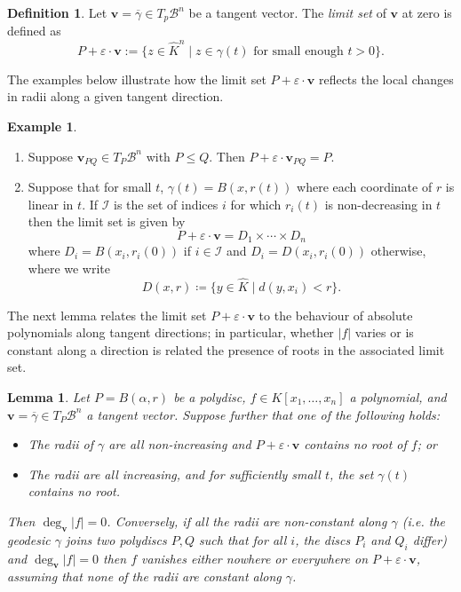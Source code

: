\documentclass[10pt]{article}
\newtheorem{lemma}[theorem]{Lemma}
\theoremstyle{definition}
\newtheorem{definition}[theorem]{Definition}
\newtheorem{example}[theorem]{Example}
\renewcommand{\vec}[1]{\mathbf{#1}}
\begin{document}
\begin{definition}
    Let $\vec{v} = \overline\gamma \in T_p \mathcal{B}^n$ be a tangent vector. The \emph{limit set} of $\vec{v}$ at zero is defined as
    $$
    P + \varepsilon \cdot \mathbf{v} := \{z \in \hat{K}^n \mid z \in \gamma(t) \text{ for small enough } t > 0 \}.
    $$
\end{definition}

The examples below illustrate how the limit set $P + \varepsilon \cdot \mathbf{v}$ reflects the local changes in radii along a given tangent direction.

\begin{example}
    \begin{enumerate}
        \item Suppose $\vec{v}_{PQ}\in T_P\mathcal B^n$ with $P \le Q$. Then $P + \varepsilon \cdot \mathbf{v}_{PQ} = P.$
        \item Suppose that for small $t$, $\gamma(t) = B(x, r(t))$ where each coordinate of $r$ is linear in $t$. If $\mathcal{I}$ is the set of indices $i$ for which $r_i(t)$ is non-decreasing in $t$ then the limit set is given by
        $$
        P + \varepsilon \cdot \mathbf{v} = D_1 \times \dotsb \times D_n
        $$
        where $D_i = B(x_i, r_i(0))$ if $i \in \mathcal{I}$ and $D_i = D(x_i, r_i(0))$ otherwise, where we write
        $$
        D(x, r) \coloneqq \{y \in \hat{K} \mid d(y, x_i) < r \}.
        $$
    \end{enumerate}
\end{example}

The next lemma relates the limit set $P + \varepsilon \cdot \vec v$ to the behaviour of absolute polynomials along tangent directions; in particular, whether $|f|$ varies or is constant along a direction is related the presence of roots in the associated limit set.

\begin{lemma} \label{lem:degreeCriterion}
    Let $P = B(\alpha, r)$ be a polydisc, $f \in K[x_1, \dotsc, x_n]$ a polynomial, and $\vec{v} = \overline \gamma \in T_P \mathcal{B}^n$ a tangent vector. Suppose further that one of the following holds:
    \begin{itemize}
        \item The radii of $\gamma$ are all non-increasing and $P + \varepsilon \cdot \mathbf{v}$ contains no root of $f$; or
        \item The radii are all increasing, and for sufficiently small $t$, the set $\gamma(t)$ contains no root.
    \end{itemize} 
    Then $\deg_{\vec{v}} \lvert f \rvert = 0$. 
    Conversely, if all the radii are non-constant along $\gamma$ (i.e. the geodesic $\gamma$ joins two polydiscs $P, Q$ such that for all $i$, the discs $P_i$ and $Q_i$ differ) and $\deg_{\vec{v}} \lvert f \rvert  = 0$ then $f$ vanishes either nowhere or everywhere on $P + \varepsilon \cdot \mathbf{v}$, assuming that none of the radii are constant along $\gamma$.
\end{lemma}
\end{document}
